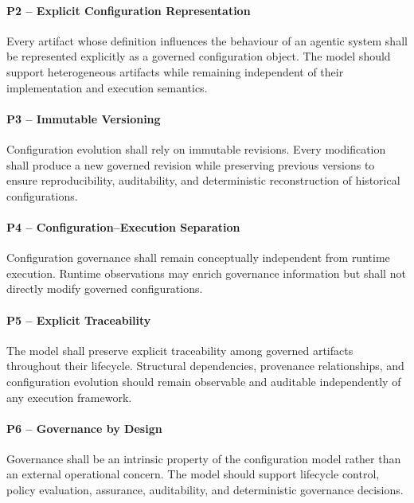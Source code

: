\documentclass[10pt]{article}
\begin{document}
\paragraph{P2 -- Explicit Configuration Representation}

Every artifact whose definition influences the behaviour of an agentic system shall be represented explicitly as a governed configuration object. The model should support heterogeneous artifacts while remaining independent of their implementation and execution semantics.

\paragraph{P3 -- Immutable Versioning}

Configuration evolution shall rely on immutable revisions. Every modification shall produce a new governed revision while preserving previous versions to ensure reproducibility, auditability, and deterministic reconstruction of historical configurations.

\paragraph{P4 -- Configuration--Execution Separation}

Configuration governance shall remain conceptually independent from runtime execution. Runtime observations may enrich governance information but shall not directly modify governed configurations.

\paragraph{P5 -- Explicit Traceability}

The model shall preserve explicit traceability among governed artifacts throughout their lifecycle. Structural dependencies, provenance relationships, and configuration evolution should remain observable and auditable independently of any execution framework.

\paragraph{P6 -- Governance by Design}

Governance shall be an intrinsic property of the configuration model rather than an external operational concern. The model should support lifecycle control, policy evaluation, assurance, auditability, and deterministic governance decisions.
\end{document}
